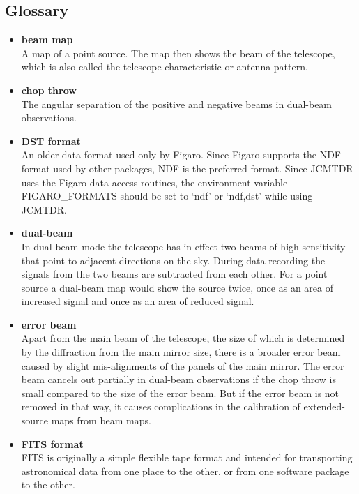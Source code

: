 \documentclass[11pt]{article}
\newcommand{\xlabel}[1]{}
\begin{document}
\subsection{\label{gloss}\xlabel{gloss}Glossary}

\begin{itemize}

\item{\bf \label{glossbeammap}beam map}\\
   A map of a point source. The map
   then shows the beam of the telescope, which is also called the
   telescope characteristic or antenna pattern.

\item{\bf \label{glosschopthrow}chop throw}\\
   The angular separation of the
   positive and negative beams in dual-beam observations.

\item{\bf \label{glossdst}DST format}\\
   An older data format used only by
   Figaro. Since Figaro supports the NDF format used by other packages,
   NDF is the preferred format. Since JCMTDR uses the Figaro data access
   routines, the environment variable FIGARO\_FORMATS should be set to
   `ndf' or `ndf,dst' while using JCMTDR.

\item{\bf \label{glossdualbeam}dual-beam}\\
   In dual-beam mode the telescope
   has in effect two beams of high
   sensitivity that point to adjacent directions on the sky. During data
   recording the signals from the two beams are subtracted from each
   other. For a point source a dual-beam map would show the source
   twice, once as an area of increased signal and once as an area of
   reduced signal.

\item{\bf \label{glosserrorbeam}error beam}\\
   Apart from the main beam of the
   telescope, the size of which is determined by the diffraction from
   the main mirror size, there is a broader error beam caused by slight
   mis-alignments of the panels of the main mirror. The error beam
   cancels out partially in dual-beam observations if the chop throw is
   small compared to the size of the error beam. But if the error beam
   is not removed in that way, it causes complications in the
   calibration of extended-source maps from beam maps.

\item{\bf \label{glossfits}FITS format}\\
   FITS is originally a simple flexible
   tape format and intended for transporting astronomical data from one
   place to the other, or from one software package to the other.


\end{itemize}
\end{document}
